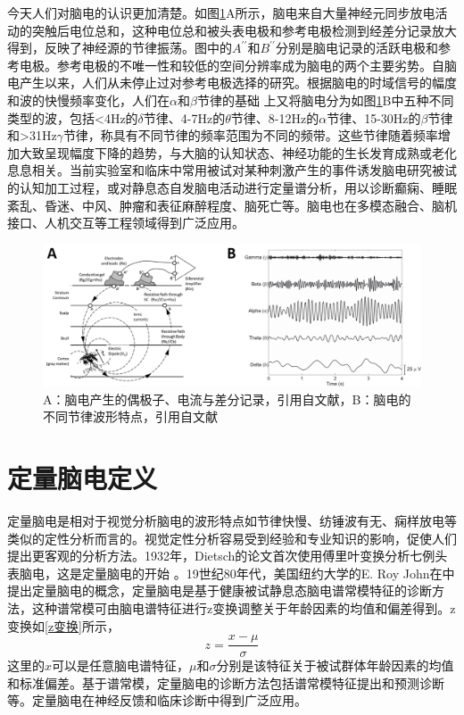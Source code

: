 今天人们对脑电的认识更加清楚。如图\ref{record}A所示，脑电来自大量神经元同步放电活动的突触后电位总和，这种电位总和被头表电极和参考电极检测到经差分记录放大得到，反映了神经源的节律振荡。图中的$A^{\prime\prime}$和$B^{\prime\prime}$分别是脑电记录的活跃电极和参考电极。参考电极的不唯一性和较低的空间分辨率成为脑电的两个主要劣势。自脑电产生以来，人们从未停止过对参考电极选择的研究。根据脑电的时域信号的幅度和波的快慢频率变化，人们在$\alpha$和$\beta$节律的基础
上又将脑电分为如图\ref{record}B中五种不同类型的波，包括<4Hz的$\delta$节律、4-7Hz的$\theta$节律、8-12Hz的$\alpha$节律、15-30Hz的$\beta$节律和>31Hz$\gamma$节律，称具有不同节律的频率范围为不同的频带。这些节律随着频率增加大致呈现幅度下降的趋势，与大脑的认知状态、神经功能的生长发育成熟或老化息息相关。当前实验室和临床中常用被试对某种刺激产生的事件诱发脑电研究被试的认知加工过程，或对静息态自发脑电活动进行定量谱分析，用以诊断癫痫、睡眠紊乱、昏迷、中风、肿瘤和表征麻醉程度、脑死亡等。脑电也在多模态融合、脑机接口、人机交互等工程领域得到广泛应用。
\begin{figure}[!h]
	\includegraphics[width=15cm]{pic/xulun/record.png}
	\caption{A：脑电产生的偶极子、电流与差分记录，引用自文献，B：脑电的不同节律波形特点，引用自文献}
	\label{record}
\end{figure}


\section{定量脑电定义}
定量脑电是相对于视觉分析脑电的波形特点如节律快慢、纺锤波有无、痫样放电等类似的定性分析而言的。视觉定性分析容易受到经验和专业知识的影响，促使人们提出更客观的分析方法。1932年，Dietsch的论文\cite{Dietsch1932}首次使用傅里叶变换分析七例头表脑电，这是定量脑电的开始
。19世纪80年代，美国纽约大学的E. Roy John在\cite{john1977neurometrics,john1980developmental}中提出定量脑电的概念，定量脑电是基于健康被试静息态脑电谱常模特征的诊断方法，这种谱常模可由脑电谱特征进行z变换调整关于年龄因素的均值和偏差得到。z变换如\eqref{z变换}所示，
\begin{equation*}\label{z变换}
z=\frac{x-\mu}{\sigma}
\end{equation*}
这里的$x$可以是任意脑电谱特征，$\mu$和$\sigma$分别是该特征关于被试群体年龄因素的均值和标准偏差。基于谱常模，定量脑电的诊断方法包括谱常模特征提出和预测诊断等。定量脑电在神经反馈和临床诊断中\cite{budzynski2009introduction,simkin2014quantitative}得到广泛应用。

